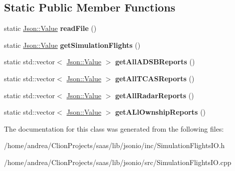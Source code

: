 \subsection*{Static Public Member Functions}
\begin{DoxyCompactItemize}
\item 
static \hyperlink{class_json_1_1_value}{Json\+::\+Value} {\bfseries read\+File} ()\hypertarget{class_simulation_flights_i_o_a94216ff482f30e981ecdcfe6b60b32e1}{}\label{class_simulation_flights_i_o_a94216ff482f30e981ecdcfe6b60b32e1}

\item 
static \hyperlink{class_json_1_1_value}{Json\+::\+Value} {\bfseries get\+Simulation\+Flights} ()\hypertarget{class_simulation_flights_i_o_a6f7ccb43c03b884d2f2e9626388eafb3}{}\label{class_simulation_flights_i_o_a6f7ccb43c03b884d2f2e9626388eafb3}

\item 
static std\+::vector$<$ \hyperlink{class_json_1_1_value}{Json\+::\+Value} $>$ {\bfseries get\+All\+A\+D\+S\+B\+Reports} ()\hypertarget{class_simulation_flights_i_o_a547b6678fe198a55d6a6b4ff9b41219a}{}\label{class_simulation_flights_i_o_a547b6678fe198a55d6a6b4ff9b41219a}

\item 
static std\+::vector$<$ \hyperlink{class_json_1_1_value}{Json\+::\+Value} $>$ {\bfseries get\+All\+T\+C\+A\+S\+Reports} ()\hypertarget{class_simulation_flights_i_o_a7bcaa781177cdd7af4b20cd2bc30a205}{}\label{class_simulation_flights_i_o_a7bcaa781177cdd7af4b20cd2bc30a205}

\item 
static std\+::vector$<$ \hyperlink{class_json_1_1_value}{Json\+::\+Value} $>$ {\bfseries get\+All\+Radar\+Reports} ()\hypertarget{class_simulation_flights_i_o_a3d0eced277e173d340808665c2e0edfa}{}\label{class_simulation_flights_i_o_a3d0eced277e173d340808665c2e0edfa}

\item 
static std\+::vector$<$ \hyperlink{class_json_1_1_value}{Json\+::\+Value} $>$ {\bfseries get\+A\+Ll\+Ownship\+Reports} ()\hypertarget{class_simulation_flights_i_o_a60542714b7bf8d2f8ce4cb335350f05d}{}\label{class_simulation_flights_i_o_a60542714b7bf8d2f8ce4cb335350f05d}

\end{DoxyCompactItemize}


The documentation for this class was generated from the following files\+:\begin{DoxyCompactItemize}
\item 
/home/andrea/\+Clion\+Projects/saas/lib/jsonio/inc/Simulation\+Flights\+I\+O.\+h\item 
/home/andrea/\+Clion\+Projects/saas/lib/jsonio/src/Simulation\+Flights\+I\+O.\+cpp\end{DoxyCompactItemize}
